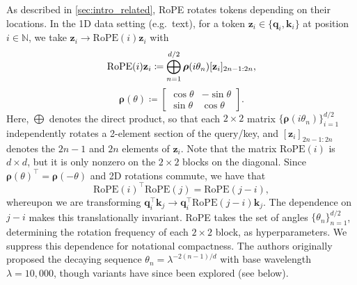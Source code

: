 As described in \cref{sec:intro_related}, RoPE rotates tokens depending on their locations. 
In the 1D data setting (e.g.~text), for a token $\mathbf{z}_i \in \{ \mathbf{q}_i, \mathbf{k}_i\}$ at position $i\in\mathbb{N}$, we take $\mathbf{z}_i \to \textrm{RoPE}(i) \mathbf{z}_i$ with
\vspace{-3mm}
\begin{equation} \label{eq:1d-rope}
\vspace{-3mm}
\textrm{RoPE}(i) \mathbf{z}_i \coloneqq 
\bigoplus_{n=1}^{d/2} 
\boldsymbol{\rho}(i\theta_n) [\mathbf{z}_i]_{2n-1:2n},
\end{equation}
\begin{equation}
\boldsymbol{\rho}(\theta) \coloneqq 
\begin{bmatrix}
\cos \theta & -\sin \theta \\
\sin \theta & \cos \theta
\end{bmatrix}.
\end{equation}
Here, $\bigoplus$ denotes the direct product, so that each $2 \times 2$ matrix $\{\boldsymbol{\rho}(i \theta_n)\}_{i=1}^{d/2}$ independently rotates a 2-element section of the query/key, and $[\mathbf{z}_i]_{2n-1:2n}$ denotes the $2n-1$ and $2n$ elements of $\mathbf{z}_i$.
Note that the matrix $\textrm{RoPE}(i)$ is $d \times d$, but it is only nonzero on the $2 \times 2$ blocks on the diagonal.
Since $\boldsymbol{\rho}(\theta)^\top = \boldsymbol{\rho}(-\theta)$ and 2D rotations commute, we have that
\begin{equation}
    \textrm{RoPE}(i)^\top \textrm{RoPE}(j) = \textrm{RoPE}(j-i), 
\end{equation}
whereupon we are transforming $\mathbf{q}_i^\top \mathbf{k}_j \to \mathbf{q}_i^\top\textrm{RoPE}(j-i) \mathbf{k}_j$.
The dependence on $j-i$ makes this translationally invariant. 
RoPE takes the set of angles $\{ \theta_n\}_{n=1}^{d/2}$, determining the rotation frequency of each $2 \times 2$ block, as hyperparameters.
We suppress this dependence for notational compactness.
The authors originally proposed the decaying sequence $\theta_n = \lambda^{-2(n-1)/d}$ with base wavelength $\lambda=10,000$, though variants have since been explored (see below). 


